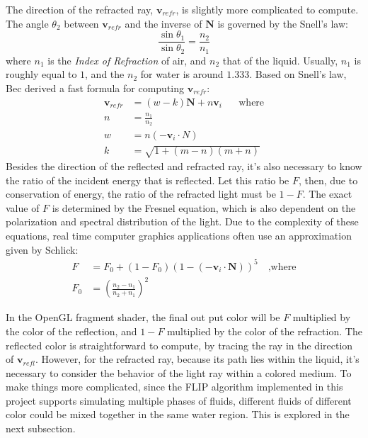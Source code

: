 The direction of the refracted ray, $\textbf{v}_{refr}$, is slightly more complicated to compute. The angle $\theta_2$ between $\textbf{v}_{refr}$ and the inverse of $\textbf{N}$ is governed by the Snell's law:
$$
\frac{\sin\theta_1}{\sin\theta_2}=\frac{n_2}{n_1}
$$
where $n_1$ is the \textit{Index of Refraction} of air, and $n_2$ that of the liquid. Usually, $n_1$ is roughly equal to $1$, and the $n_2$ for water is around $1.333$. Based on Snell's law, Bec\cite{bec1997faster} derived a fast formula for computing $\textbf{v}_{refr}$:
\begin{equation}
    \label{eqn direction of refraction}
    \begin{aligned}
        \textbf{v}_{refr} &= (w-k)\textbf{N} + n\textbf{v}_{i}\mbox{~~~~ where}\\
        n &= \frac{n_1}{n_2}\\
        w &= n(-\textbf{v}_i \cdot N) \\
        k &= \sqrt{1+(m-n)(m+n)} 
    \end{aligned}
\end{equation}
Besides the direction of the reflected and refracted ray, it's also necessary to know the ratio of the incident energy that is reflected. Let this ratio be $F$, then, due to conservation of energy, the ratio of the refracted light must be $1-F$. The exact value of $F$ is determined by the Fresnel equation, which is also dependent on the polarization and spectral distribution of the light. Due to the complexity of these equations, real time computer graphics applications often use an approximation given by Schlick\cite{schlick1994inexpensive}:
\begin{equation}
    \label{eqn Schlick}
    \begin{aligned}
        F &= F_0 + (1-F_0)(1-(-\textbf{v}_i \cdot \textbf{N}))^5\mbox{~~~,where}\\
        F_0 &= \left(\frac{n_2-n_1}{n_2+n_1}\right)^2
    \end{aligned}
\end{equation}


In the OpenGL fragment shader, the final out put color will be $F$ multiplied by the color of the reflection, and $1-F$ multiplied by the color of the refraction. The reflected color is straightforward to compute, by tracing the ray in the direction of $\textbf{v}_{refl}$. However, for the refracted ray, because its path lies within the liquid, it's necessary to consider the behavior of the light ray within a colored medium. To make things more complicated, since the FLIP algorithm implemented in this project supports simulating multiple phases of fluids, different fluids of different color could be mixed together in the same water region. This is explored in the next subsection.

